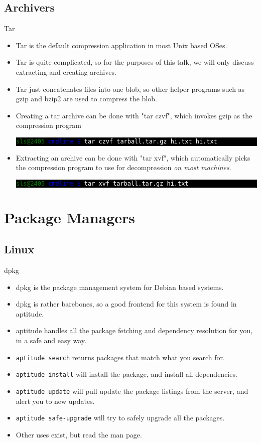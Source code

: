 \documentclass[10pt]{beamer}
\makeatletter
\newcommand{\codeblockWO}[2]
{
  \colorbox{black}{
    \begin{minipage}{\linewidth}
      \texttt{\textcolor{green}{sls@2405} \textcolor{blue}{cmdline \$} \textcolor{white}{#1}
      \newline
      \textcolor{white}{#2}}
    \end{minipage}
  }
}
\makeatother
\begin{document}
\subsection{Archivers}
\begin{frame}{Tar}
\begin{itemize}
\item Tar is the default compression application in most Unix based OSes.
\pause

\item Tar is quite complicated, so for the purposes of this talk, we will only discuss extracting and creating archives.
\pause

\item Tar just concatenates files into one blob, so other helper programs such as gzip and bzip2 are used to compress the blob.
\pause

\item Creating a tar archive can be done with "tar czvf", which invokes gzip as the compression program
\codeblockWO{tar czvf tarball.tar.gz hi.txt}{hi.txt}

\item Extracting an archive can be done with "tar xvf", which automatically picks the compression program to use for decompression \textit{on most machines}.
\codeblockWO{tar xvf tarball.tar.gz}{hi.txt}
\end{itemize}
\end{frame}

\section{Package Managers}

\subsection{Linux}
\begin{frame}{dpkg}
\begin{itemize}[<+->]
\item dpkg is the package management system for Debian based systems.
\item dpkg is rather barebones, so a good frontend for this system is found in aptitude.
\item aptitude handles all the package fetching and dependency resolution for you, in a safe and easy way.
\item \texttt{\color{blue}aptitude search} returns packages that match what you search for.
\item \texttt{\color{blue}aptitude install} will install the package, and install all dependencies.
\item \texttt{\color{blue}aptitude update} will pull update the package listings from the server, and alert you to new updates.
\item \texttt{\color{blue}aptitude safe-upgrade} will try to safely upgrade all the packages.
\item Other uses exist, but read the man page.
\end{itemize}
\end{frame}
\end{document}

